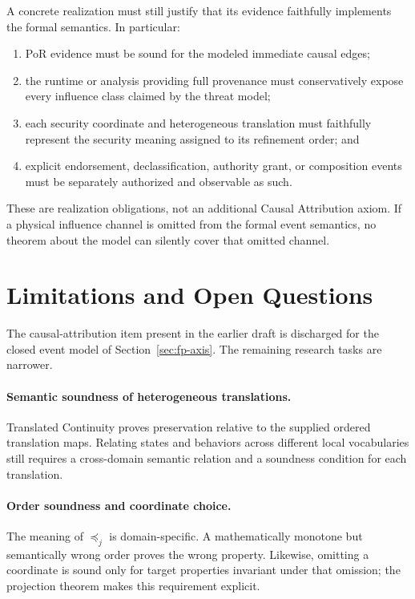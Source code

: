 \documentclass[10pt,twocolumn]{article}
\begin{document}
A concrete realization must still justify that its evidence faithfully
implements the formal semantics. In particular:
\begin{enumerate}[leftmargin=*]
  \item PoR evidence must be sound for the modeled immediate causal edges;
  \item the runtime or analysis providing full provenance must conservatively
        expose every influence class claimed by the threat model;
  \item each security coordinate and heterogeneous translation must faithfully
        represent the security meaning assigned to its refinement order; and
  \item explicit endorsement, declassification, authority grant, or composition
        events must be separately authorized and observable as such.
\end{enumerate}
These are realization obligations, not an additional Causal Attribution axiom.
If a physical influence channel is omitted from the formal event semantics, no
theorem about the model can silently cover that omitted channel.

\section{Limitations and Open Questions}

The causal-attribution item present in the earlier draft is discharged for the
closed event model of Section~\ref{sec:fp-axis}. The remaining research tasks
are narrower.

\paragraph{Semantic soundness of heterogeneous translations.}
Translated Continuity proves preservation relative to the supplied ordered
translation maps. Relating states and behaviors across different local
vocabularies still requires a cross-domain semantic relation and a soundness
condition for each translation.

\paragraph{Order soundness and coordinate choice.}
The meaning of $\preceq_j$ is domain-specific. A mathematically monotone but
semantically wrong order proves the wrong property. Likewise, omitting a
coordinate is sound only for target properties invariant under that omission;
the projection theorem makes this requirement explicit.
\end{document}
